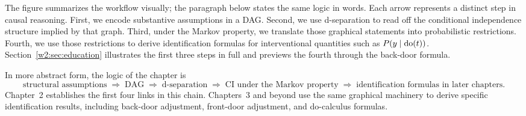 \documentclass[master.tex]{subfiles}
\begin{document}
\bigskip
\begin{center}
\end{center}
\bigskip

The figure summarizes the workflow visually; the paragraph below states
the same logic in words.
Each arrow represents a distinct step in causal reasoning.
First, we encode substantive assumptions in a DAG\@.
Second, we use d-separation to read off the conditional independence
structure implied by that graph.
Third, under the Markov property, we translate those graphical statements
into probabilistic restrictions.
Fourth, we use those restrictions to derive identification formulas for
interventional quantities such as $P(y \mid \mathrm{do}(t))$.
Section~\ref{w2:sec:education} illustrates the first three steps in full
and previews the fourth through the back-door formula.

In more abstract form, the logic of the chapter is
\[
  \text{structural assumptions}
  \;\Longrightarrow\;
  \text{DAG}
  \;\Longrightarrow\;
  \text{d-separation}
  \;\Longrightarrow\;
  \text{CI under the Markov property}
  \;\Longrightarrow\;
  \text{identification formulas in later chapters}.
\]
Chapter~2 establishes the first four links in this chain.
Chapters~3 and beyond use the same graphical machinery to derive specific
identification results, including back-door adjustment, front-door
adjustment, and do-calculus formulas.
\end{document}
